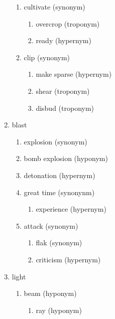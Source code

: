 \documentclass[11pt,a4paper,twocolumn]{article}
\begin{document}
\begin{enumerate}
\begin{enumerate}
					\item cultivate (synonym)
						\begin{enumerate}
							\item overcrop (troponym)
			
							\item ready (hypernym)							
							
						\end{enumerate}		
						
					\item clip (synonym)
						\begin{enumerate}
							\item make sparse (hypernym)
							
							\item shear (troponym)
							
							\item disbud (troponym)
						\end{enumerate}															
					
				\end{enumerate}
			
			\item blast
				\begin{enumerate}
					\item explosion (synonym)
					
					\item bomb explosion (hyponym)
					
					\item detonation (hypernym)
					
					\item great time (synonynm)
						\begin{enumerate}
							\item experience (hypernym)
						\end{enumerate}
						
					\item attack (synonym)
						\begin{enumerate}
							\item flak (synonym)
							
							\item criticism (hypernym)
						\end{enumerate}
				\end{enumerate}
			
			\item light
				\begin{enumerate}
					\item beam (hyponym)
						\begin{enumerate}
							\item ray (hyponym)
							

\end{enumerate}
\end{enumerate}
\end{enumerate}
\end{document}
